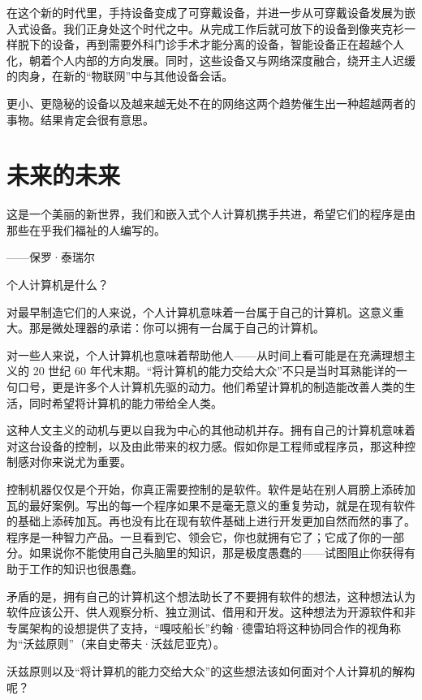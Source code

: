 \documentclass[12pt,UTF8]{ctexbook}
\begin{document}
在这个新的时代里，手持设备变成了可穿戴设备，并进一步从可穿戴设备发展为嵌入式设备。我们正身处这个时代之中。从完成工作后就可放下的设备到像夹克衫一样脱下的设备，再到需要外科门诊手术才能分离的设备，智能设备正在超越个人化，朝着个人内部的方向发展。同时，这些设备又与网络深度融合，绕开主人迟缓的肉身，在新的“物联网”中与其他设备会话。

更小、更隐秘的设备以及越来越无处不在的网络这两个趋势催生出一种超越两者的事物。结果肯定会很有意思。





\section{未来的未来}


这是一个美丽的新世界，我们和嵌入式个人计算机携手共进，希望它们的程序是由那些在乎我们福祉的人编写的。

——保罗·泰瑞尔



个人计算机是什么？

对最早制造它们的人来说，个人计算机意味着一台属于自己的计算机。这意义重大。那是微处理器的承诺：你可以拥有一台属于自己的计算机。

对一些人来说，个人计算机也意味着帮助他人——从时间上看可能是在充满理想主义的 20 世纪 60 年代末期。“将计算机的能力交给大众”不只是当时耳熟能详的一句口号，更是许多个人计算机先驱的动力。他们希望计算机的制造能改善人类的生活，同时希望将计算机的能力带给全人类。

这种人文主义的动机与更以自我为中心的其他动机并存。拥有自己的计算机意味着对这台设备的控制，以及由此带来的权力感。假如你是工程师或程序员，那这种控制感对你来说尤为重要。

控制机器仅仅是个开始，你真正需要控制的是软件。软件是站在别人肩膀上添砖加瓦的最好案例。写出的每一个程序如果不是毫无意义的重复劳动，就是在现有软件的基础上添砖加瓦。再也没有比在现有软件基础上进行开发更加自然而然的事了。程序是一种智力产品。一旦看到它、领会它，你也就拥有它了；它成了你的一部分。如果说你不能使用自己头脑里的知识，那是极度愚蠢的——试图阻止你获得有助于工作的知识也很愚蠢。

矛盾的是，拥有自己的计算机这个想法助长了不要拥有软件的想法，这种想法认为软件应该公开、供人观察分析、独立测试、借用和开发。这种想法为开源软件和非专属架构的设想提供了支持，“嘎吱船长”约翰·德雷珀将这种协同合作的视角称为“沃兹原则”（来自史蒂夫·沃兹尼亚克）。

沃兹原则以及“将计算机的能力交给大众”的这些想法该如何面对个人计算机的解构呢？
\end{document}
